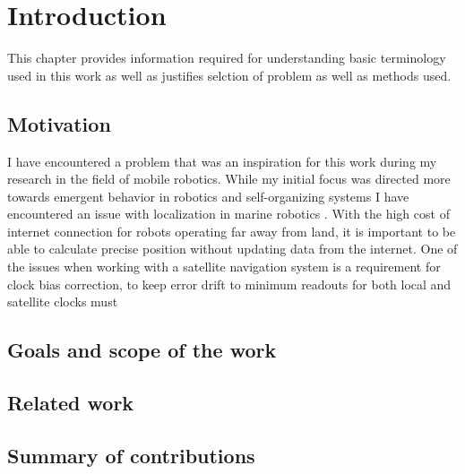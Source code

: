 \chapter{Introduction}
This chapter provides information required for understanding basic terminology used in this
work as well as justifies selction of problem as well as methods used.


\FloatBarrier
\section{Motivation}
I have encountered a problem that was an inspiration for this work during my research in the 
field of mobile robotics.
While my initial focus was directed more towards emergent behavior in robotics and self-organizing 
systems \cite{Gnys2017}\cite{Gnys2019} I have encountered an issue with localization in marine 
robotics \cite{Cabrera-Gamez2014}.
With the high cost of internet connection for robots operating far away from land, 
it is important to be able to calculate precise position without updating data from the internet.
One of the issues when working with a satellite navigation system is a requirement for clock bias
correction, to keep error drift to minimum readouts for both local and satellite clocks must

\FloatBarrier
\section{Goals and scope of the work}

\FloatBarrier
\section{Related work}


\FloatBarrier
\section{Summary of contributions}

\FloatBarrier
